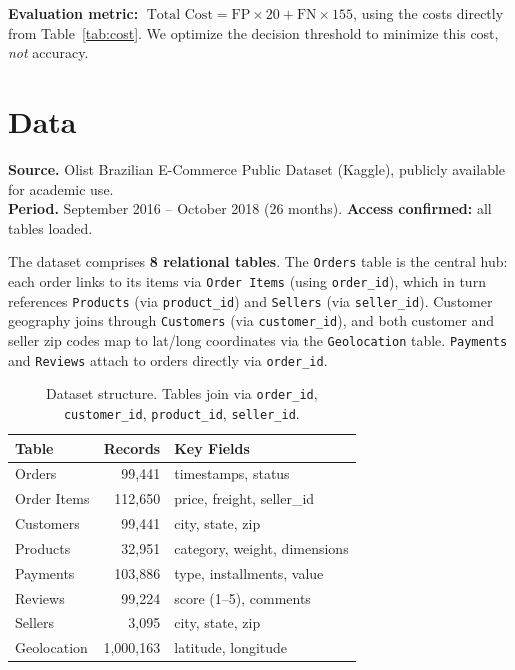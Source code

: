 \documentclass[11pt,a4paper]{article}
\begin{document}
\textbf{Evaluation metric:} $\;\text{Total Cost} = \text{FP} \times 20 + \text{FN} \times 155$, using the costs directly from Table~\ref{tab:cost}. We optimize the decision threshold to minimize this cost, \emph{not} accuracy.

\section{Data}

\textbf{Source.} Olist Brazilian E-Commerce Public Dataset (Kaggle), publicly available for academic use. \\
\textbf{Period.} September 2016 -- October 2018 (26 months). \quad \textbf{Access confirmed:} all tables loaded.

The dataset comprises \textbf{8 relational tables}. The \texttt{Orders} table is the central hub: each order links to its items via \texttt{Order Items} (using \texttt{order\_id}), which in turn references \texttt{Products} (via \texttt{product\_id}) and \texttt{Sellers} (via \texttt{seller\_id}). Customer geography joins through \texttt{Customers} (via \texttt{customer\_id}), and both customer and seller zip codes map to lat/long coordinates via the \texttt{Geolocation} table. \texttt{Payments} and \texttt{Reviews} attach to orders directly via \texttt{order\_id}.

\begin{table}[H]
\centering\small
\begin{tabular}{@{}lrl@{}}
\toprule
\textbf{Table} & \textbf{Records} & \textbf{Key Fields} \\ \midrule
Orders & 99,441 & timestamps, status \\
Order Items & 112,650 & price, freight, seller\_id \\
Customers & 99,441 & city, state, zip \\
Products & 32,951 & category, weight, dimensions \\
Payments & 103,886 & type, installments, value \\
Reviews & 99,224 & score (1--5), comments \\
Sellers & 3,095 & city, state, zip \\
Geolocation & 1,000,163 & latitude, longitude \\ \bottomrule
\end{tabular}
\caption{Dataset structure. Tables join via \texttt{order\_id}, \texttt{customer\_id}, \texttt{product\_id}, \texttt{seller\_id}.}
\end{table}
\end{document}
